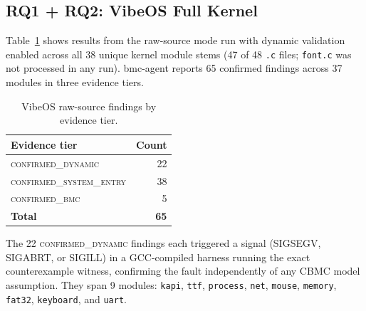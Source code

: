 \documentclass[11pt,a4paper]{article}
\newcommand{\tool}{bmc-agent\xspace}
\newcommand{\dynconf}{\textsc{confirmed\_dynamic}\xspace}
\newcommand{\sysconf}{\textsc{confirmed\_system\_entry}\xspace}
\newcommand{\bmcconf}{\textsc{confirmed\_bmc}\xspace}
\begin{document}
\subsection{RQ1 + RQ2: VibeOS Full Kernel}

Table~\ref{tab:vibeos-full} shows results from the raw-source mode run with
dynamic validation enabled across all 38 unique kernel module stems (47 of 48
\texttt{.c} files; \texttt{font.c} was not processed in any run). \tool
reports 65 confirmed findings across 37 modules in three evidence tiers.

\begin{table}[t]
\caption{VibeOS raw-source findings by evidence tier.}
\label{tab:vibeos-full}
\begin{tabular}{lr}
\toprule
\textbf{Evidence tier} & \textbf{Count} \\
\midrule
\dynconf{}     & 22  \\
\sysconf{}     & 38 \\
\bmcconf{}     & 5  \\
\midrule
\textbf{Total} & \textbf{65} \\
\bottomrule
\end{tabular}
\end{table}

The 22 \dynconf findings each triggered a signal (SIGSEGV, SIGABRT, or SIGILL)
in a GCC-compiled harness running the exact counterexample witness, confirming
the fault independently of any CBMC model assumption. They span 9 modules:
\texttt{kapi}, \texttt{ttf}, \texttt{process}, \texttt{net}, \texttt{mouse},
\texttt{memory}, \texttt{fat32}, \texttt{keyboard}, and \texttt{uart}.
\end{document}
